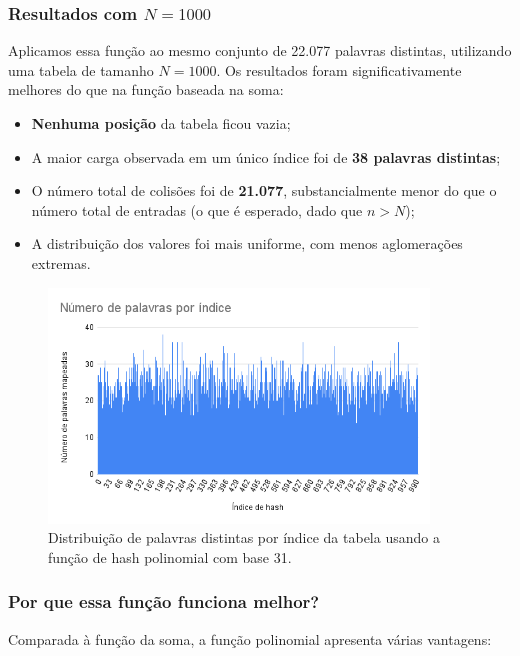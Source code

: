 \subsubsection*{Resultados com $N = 1000$}

Aplicamos essa função ao mesmo conjunto de 22.077 palavras distintas, utilizando uma tabela de tamanho $N = 1000$. Os resultados foram significativamente melhores do que na função baseada na soma:

\begin{itemize}
  \item \textbf{Nenhuma posição} da tabela ficou vazia;
  \item A maior carga observada em um único índice foi de \textbf{38 palavras distintas};
  \item O número total de colisões foi de \textbf{21.077}, substancialmente menor do que o número total de entradas (o que é esperado, dado que $n > N$);
  \item A distribuição dos valores foi mais uniforme, com menos aglomerações extremas.
\end{itemize}

\begin{figure}[h]
\centering
\includegraphics[width=0.9\textwidth]{polinomial.png} %
\caption{Distribuição de palavras distintas por índice da tabela usando a função de hash polinomial com base 31.}
\end{figure}

\subsubsection*{Por que essa função funciona melhor?}

Comparada à função da soma, a função polinomial apresenta várias vantagens:

